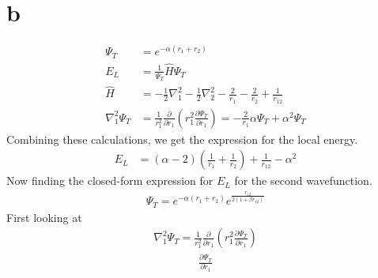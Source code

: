 \documentclass[a4paper, 12pt, titlepage]{article}
\begin{document}
\section*{b}
\begin{align*}
	\Psi_T &= e^{-\alpha(r_1 + r_2)} \\
	E_L &= \frac{1}{\Psi_T} \hat H \Psi_T \\
	\hat H &= -\frac{1}{2}\nabla_1^2 - \frac{1}{2}\nabla_2^2 - \frac{2}{r_1} - \frac{2}{r_2} + \frac{1}{r_{12}} \\
	\nabla_1^2 \Psi_T &= \frac{1}{r_1^2}\frac{\partial}{\partial r_1}\left(r_1^2 \frac{\partial \Psi_T}{\partial r_1}\right) = -\frac{2}{r_1}\alpha \Psi_T + \alpha^2\Psi_T
\end{align*}
Combining these calculations, we get the expression for the local energy. 
\begin{align*}
	E_L &= (\alpha - 2) \left( \frac{1}{r_1} + \frac{1}{r_2}\right) + \frac{1}{r_{12}} - \alpha^2
\end{align*}
Now finding the closed-form expression for $E_L$ for the second wavefunction. 
\begin{align*}
	\Psi_T = e^{-\alpha(r_1 + r_2)}e^{\frac{r_{12}}{2(1+\beta r_{12})}}
\end{align*}
First looking at
\begin{align*}
	\nabla_1^2 \Psi_T = \frac{1}{r_1^2}\frac{\partial}{\partial r_1}\left(r_1^2 \frac{\partial \Psi_T}{\partial r_1}\right)
\end{align*}
\begin{align*}
	\frac{\partial \Psi_T}{\partial r_1}
\end{align*}
\end{document}

